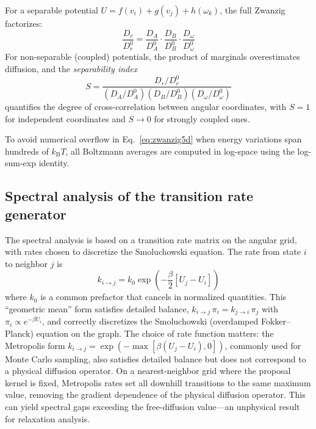 \documentclass[aps,jcp,reprint,superscriptaddress]{revtex4-2}
\newcommand{\kB}{k_\mathrm{B}}
\begin{document}
For a separable potential $U = f(v_i) + g(v_j) + h(\omega_k)$,
the full Zwanzig factorizes:
\begin{equation}
  \frac{D_r}{D_r^0}
  = \frac{D_A}{D_A^0} \cdot \frac{D_B}{D_B^0} \cdot \frac{D_\omega}{D_\omega^0}
  \label{eq:factorize}
\end{equation}
For non-separable (coupled) potentials, the product of marginals overestimates
diffusion, and the \emph{separability index}
\begin{equation}
  S = \frac{D_r/D_r^0}{(D_A/D_A^0)(D_B/D_B^0)(D_\omega/D_\omega^0)}
  \label{eq:separability}
\end{equation}
quantifies the degree of cross-correlation between angular coordinates,
with $S = 1$ for independent coordinates and $S \to 0$ for strongly coupled ones.

To avoid numerical overflow in Eq.~\eqref{eq:zwanzig5d} when energy variations
span hundreds of $\kB T$, all Boltzmann averages are computed in log-space using
the log-sum-exp identity.

\subsection{Spectral analysis of the transition rate generator}
\label{sec:spectral}

The spectral analysis is based on a transition rate matrix on the angular
grid, with rates chosen to discretize the Smoluchowski equation.
The rate from state $i$ to neighbor $j$ is
\begin{equation}
  k_{i \to j} = k_0 \exp\!\left(-\frac{\beta}{2}[U_j - U_i]\right)
  \label{eq:smoluchowski_rate}
\end{equation}
where $k_0$ is a common prefactor that cancels in normalized quantities.
This ``geometric mean'' form satisfies detailed balance,
$k_{i \to j} \, \pi_i = k_{j \to i} \, \pi_j$
with $\pi_i \propto e^{-\beta U_i}$, and correctly discretizes the
Smoluchowski (overdamped Fokker--Planck) equation on the graph.
The choice of rate function matters: the Metropolis form
$k_{i \to j} = \exp(-\max[\beta(U_j - U_i), 0])$, commonly used for
Monte Carlo sampling, also satisfies detailed balance but does not
correspond to a physical diffusion operator.
On a nearest-neighbor grid where the proposal kernel is fixed,
Metropolis rates set all downhill transitions to the same maximum value,
removing the gradient dependence of the physical diffusion operator.
This can yield spectral gaps exceeding the free-diffusion value---an
unphysical result for relaxation analysis.
\end{document}
